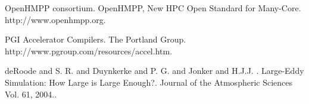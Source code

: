 
\begin{thebibliography}{10}

{\sc OpenHMPP consortium}. {OpenHMPP, New HPC Open Standard for Many-Core}. http://www.openhmpp.org.



{\sc PGI Accelerator Compilers}. {The Portland Group}. http://www.pgroup.com/resources/accel.htm.



{\sc deRoode  and S. R. and Duynkerke  and P. G. and Jonker  and H.J.J. }. {Large-Eddy Simulation: How Large is Large Enough?}. Journal of the Atmospheric Sciences Vol. 61, 2004..

\end{thebibliography}
